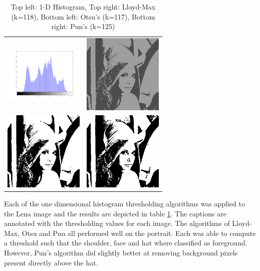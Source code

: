 \documentclass[journal]{IEEEtran}
\begin{document}
\begin{table}[!h]
\centering
\begin{tabular}{cc}
\includegraphics[width=1.5in]{../results/lena_gray_256_hist.png} &
\includegraphics[width=1.5in]{../results/lena_gray_256_lloydmax.png} \\
\newline
\includegraphics[width=1.5in]{../results/lena_gray_256_otsu.png} &
\includegraphics[width=1.5in]{../results/lena_gray_256_pun.png} \\
\end{tabular}
\caption{Top left: 1-D Histogram, Top right: Lloyd-Max (k=118), Bottom left: Otsu's (k=117), Bottom right: Pun's (k=125)}
\label{tab:lenaTable1}
\end{table}

\par Each of the one dimensional histogram thresholding algorithms was applied to the Lena image and the results are depicted in table \ref{tab:lenaTable1}. The captions are annotated with the thresholding values for each image. The algorithms of Lloyd-Max, Otsu and Pun all performed well on the portrait. Each was able to compute a threshold such that the shoulder, face and hat where classified as foreground. However, Pun's algorithm did slightly better at removing background pixels present directly above the hat.
\end{document}
